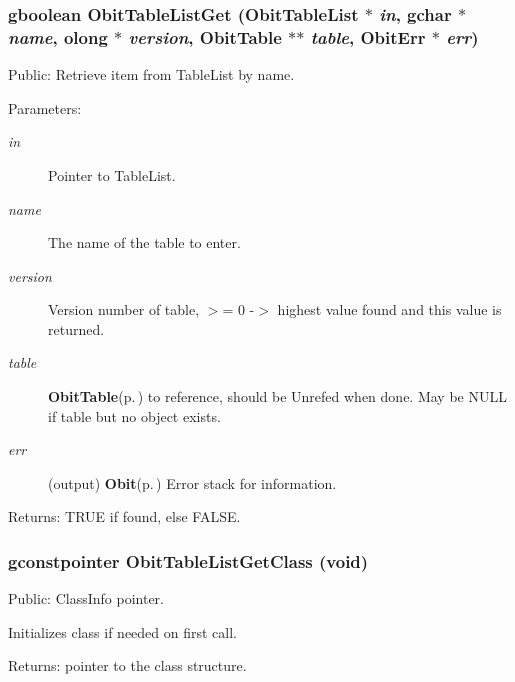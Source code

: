 \subsubsection{\setlength{\rightskip}{0pt plus 5cm}gboolean Obit\-Table\-List\-Get ({\bf Obit\-Table\-List} $\ast$ {\em in}, gchar $\ast$ {\em name}, {\bf olong} $\ast$ {\em version}, {\bf Obit\-Table} $\ast$$\ast$ {\em table}, {\bf Obit\-Err} $\ast$ {\em err})}\label{ObitTableList_8c_a14}


Public: Retrieve item from Table\-List by name. 

\begin{Desc}
\item[Parameters:]
\begin{description}
\item[{\em in}]Pointer to Table\-List. \item[{\em name}]The name of the table to enter. \item[{\em version}]Version number of table, $>$= 0 -$>$ highest value found and this value is returned. \item[{\em table}]{\bf Obit\-Table}{\rm (p.\,\pageref{structObitTable})} to reference, should be Unrefed when done. May be NULL if table but no object exists. \item[{\em err}](output) {\bf Obit}{\rm (p.\,\pageref{structObit})} Error stack for information. \end{description}
\end{Desc}
\begin{Desc}
\item[Returns:]TRUE if found, else FALSE. \end{Desc}
\subsubsection{\setlength{\rightskip}{0pt plus 5cm}gconstpointer Obit\-Table\-List\-Get\-Class (void)}\label{ObitTableList_8c_a11}


Public: Class\-Info pointer. 

Initializes class if needed on first call. \begin{Desc}
\item[Returns:]pointer to the class structure. \end{Desc}
